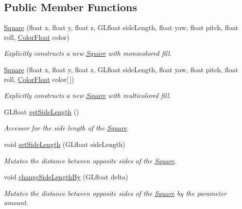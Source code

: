 \subsection*{Public Member Functions}
\begin{DoxyCompactItemize}
\item 
\hyperlink{classtsgl_1_1_square_a1279be7f6ddfc10491c6d77ff9cc18bf}{Square} (float x, float y, float z, G\+Lfloat side\+Length, float yaw, float pitch, float roll, \hyperlink{structtsgl_1_1_color_float}{Color\+Float} color)
\begin{DoxyCompactList}\small\item\em Explicitly constructs a new \hyperlink{classtsgl_1_1_square}{Square} with monocolored fill. \end{DoxyCompactList}\item 
\hyperlink{classtsgl_1_1_square_a9c8c6685801135adbb3ca4c94c0df4a3}{Square} (float x, float y, float z, G\+Lfloat side\+Length, float yaw, float pitch, float roll, \hyperlink{structtsgl_1_1_color_float}{Color\+Float} color\mbox{[}$\,$\mbox{]})
\begin{DoxyCompactList}\small\item\em Explicitly constructs a new \hyperlink{classtsgl_1_1_square}{Square} with multicolored fill. \end{DoxyCompactList}\item 
G\+Lfloat \hyperlink{classtsgl_1_1_square_adf0871e17342a6a44361463015c5bc46}{get\+Side\+Length} ()
\begin{DoxyCompactList}\small\item\em Accessor for the side length of the \hyperlink{classtsgl_1_1_square}{Square}. \end{DoxyCompactList}\item 
void \hyperlink{classtsgl_1_1_square_a0517236849893cdf0ab097df69e3416d}{set\+Side\+Length} (G\+Lfloat side\+Length)
\begin{DoxyCompactList}\small\item\em Mutates the distance between opposite sides of the \hyperlink{classtsgl_1_1_square}{Square}. \end{DoxyCompactList}\item 
void \hyperlink{classtsgl_1_1_square_a9804eb52021958970ff482625682d0d0}{change\+Side\+Length\+By} (G\+Lfloat delta)
\begin{DoxyCompactList}\small\item\em Mutates the distance between opposite sides of the \hyperlink{classtsgl_1_1_square}{Square} by the parameter amount. \end{DoxyCompactList}\end{DoxyCompactItemize}

